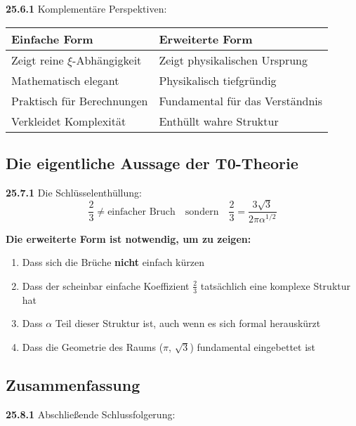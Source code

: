 \documentclass[12pt,a4paper]{article}
\begin{document}
\noindent \textbf{25.6.1} Komplementäre Perspektiven:

\begin{tabular}{p{}p{}}
	\textbf{Einfache Form} & \textbf{Erweiterte Form} \\
	\hline
	Zeigt reine $\xi$-Abhängigkeit & Zeigt physikalischen Ursprung \\
	Mathematisch elegant & Physikalisch tiefgründig \\
	Praktisch für Berechnungen & Fundamental für das Verständnis \\
	Verkleidet Komplexität & Enthüllt wahre Struktur \\
\end{tabular}

\subsection{Die eigentliche Aussage der T0-Theorie}

\noindent \textbf{25.7.1} Die Schlüsselenthüllung:
\[
\boxed{
	\frac{2}{3} \neq \text{einfacher Bruch} \quad \text{sondern} \quad \frac{2}{3} = \frac{3\sqrt{3}}{2\pi\alpha^{1/2}}
}
\]

\begin{tcolorbox}[colback=green!5!white,colframe=green!75!black]
	\textbf{Die erweiterte Form ist notwendig, um zu zeigen:}
	\begin{enumerate}
		\item Dass sich die Brüche \textbf{nicht} einfach kürzen
		\item Dass der scheinbar einfache Koeffizient $\frac{2}{3}$ tatsächlich eine komplexe Struktur hat
		\item Dass $\alpha$ Teil dieser Struktur ist, auch wenn es sich formal herauskürzt
		\item Dass die Geometrie des Raums ($\pi$, $\sqrt{3}$) fundamental eingebettet ist
	\end{enumerate}
\end{tcolorbox}

\subsection{Zusammenfassung}

\noindent \textbf{25.8.1} Abschließende Schlussfolgerung:
\begin{center}
\end{center}
\end{document}

